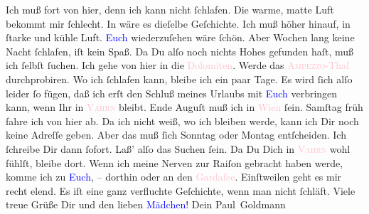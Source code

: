 \pstart
           Ich muß fort von hier, denn ich kann nicht ſchlafen. Die warme, matte Luft bekommt
               mir ſchlecht. In \label{K_L03076-1v}\label{K_L03076-1h} wäre es dieſelbe Geſchichte. Ich muß höher hinauf, in ſtarke und
               kühle Luft. \textcolor{blue}{Euch}{}\ledrightnote{{$\rightarrow$}\textcolor{blue}{Olga Schnitzler}}
               wiederzuſehen wäre ſchön. Aber Wochen lang keine Nacht ſchlafen, iſt kein Spaß. Da Du
               alſo noch nichts Hohes gefunden haſt, muß ich ſelbſt ſuchen. Ich gehe von hier in die
                  \textcolor{pink}{Dolomiten}{}\ledrightnote{\textcolor{pink}{Dolomiten}}. Werde das \textcolor{pink}{\textsc{Ampezzo}-Thal}{}\ledrightnote{\textcolor{pink}{Valle d’Ampezzo}} durchprobiren. Wo ich ſchlafen kann,
               bleibe ich ein paar Tage. Es wird ſich alſo leider ſo fügen, {\pb}daß ich erſt den Schluß meines
               Urlaubs mit \textcolor{blue}{Euch}{}\ledrightnote{{$\rightarrow$}\textcolor{blue}{Olga Schnitzler}} verbringen
               kann, wenn Ihr in \textsc{\textcolor{pink}{Vahrn}{}\ledrightnote{\textcolor{pink}{Vahrn}}} bleibt.  Ende Auguſt muß ich in \textcolor{pink}{Wien}{}\ledrightnote{\textcolor{pink}{Wien}} ſein. Samſtag{ }früh fahre ich von hier ab. Da ich nicht weiß, wo ich bleiben werde,
               kann ich Dir noch keine Adreſſe  geben. Aber das muß
               ſich Sonntag oder Montag entſcheiden. Ich ſchreibe Dir dann ſofort. Laß’ alſo das Suchen
               ſein. Da Du Dich in \textsc{\textcolor{pink}{Vahrn}{}\ledrightnote{\textcolor{pink}{Vahrn}}} wohl fühlſt, bleibe dort. Wenn ich meine Nerven zur Raiſon gebracht haben
               werde, komme ich zu \textcolor{blue}{Euch}{}\ledrightnote{{$\rightarrow$}\textcolor{blue}{Olga Schnitzler}}, –
               dorthin oder an den \textcolor{pink}{Gardaſee}{}\ledrightnote{\textcolor{pink}{Lago di Garda}}. Einſtweilen geht
               es mir recht elend. Es iſt eine ganz verfluchte Geſchichte, wenn man nicht ſchläft.
               Viele treue Grüße Dir und den lieben \textcolor{blue}{Mädchen}{}\ledrightnote{{$\rightarrow$}\textcolor{blue}{Olga Schnitzler}{\newline}{$\rightarrow$}\textcolor{blue}{Elisabeth Steinrück}}!\pend
           \pstart Dein \spacefill\mbox{Paul Goldmann}\pend{}\endnumbering{}  
      